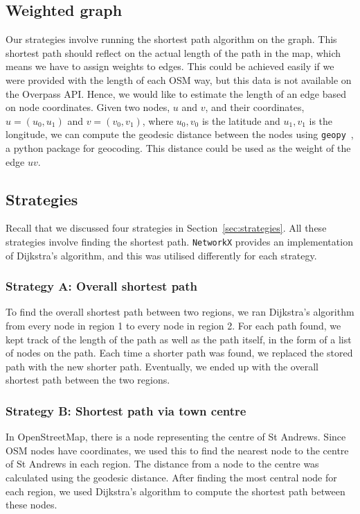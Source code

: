 \documentclass[12pt,a4paper]{report}
\begin{document}
\subsection{Weighted graph}\label{sec:weighted}
Our strategies involve running the shortest path algorithm on the graph. This shortest path should reflect on the actual length of the path in the map, which means we have to assign weights to edges. This could be achieved easily if we were provided with the length of each OSM way, but this data is not available on the Overpass API. Hence, we would like to estimate the length of an edge based on node coordinates. Given two nodes, $u$ and $v$, and their coordinates, $u = (u_0, u_1)$ and $v = (v_0, v_1)$, where $u_0, v_0$ is the latitude and $u_1, v_1$ is the longitude, we can compute the geodesic distance between the nodes using \texttt{geopy}~\cite{geopy}, a python package for geocoding. This distance could be used as the weight of the edge $uv$.

\subsection{Strategies}
Recall that we discussed four strategies in Section~\ref{sec:strategies}. All these strategies involve finding the shortest path. \texttt{NetworkX} provides an implementation of Dijkstra's algorithm, and this was utilised differently for each strategy. 

\subsubsection*{Strategy A: Overall shortest path}
To find the overall shortest path between two regions, we ran Dijkstra's algorithm from every node in region 1 to every node in region 2. For each path found, we kept track of the length of the path as well as the path itself, in the form of a list of nodes on the path. Each time a shorter path was found, we replaced the stored path with the new shorter path. Eventually, we ended up with the overall shortest path between the two regions.

\subsubsection*{Strategy B: Shortest path via town centre}
In OpenStreetMap, there is a node representing the centre of St Andrews. Since OSM nodes have coordinates, we used this to find the nearest node to the centre of St Andrews in each region. The distance from a node to the centre was calculated using the geodesic distance. After finding the most central node for each region, we used Dijkstra's algorithm to compute the shortest path between these nodes.
\end{document}
